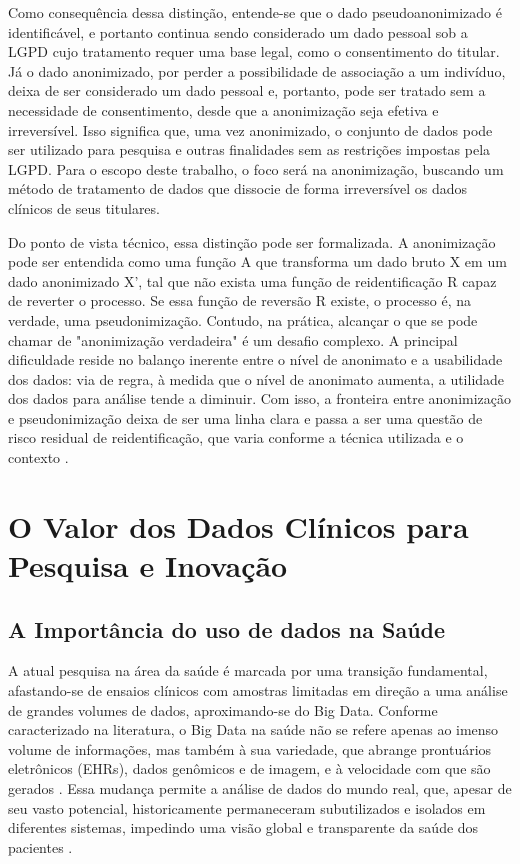 Como consequência dessa distinção, entende-se que o dado pseudoanonimizado é identificável, e portanto continua sendo considerado um dado pessoal sob a LGPD cujo tratamento requer uma base legal, como o consentimento do titular. Já o dado anonimizado, por perder a possibilidade de associação a um indivíduo, deixa de ser considerado um dado pessoal e, portanto, pode ser tratado sem a necessidade de consentimento, desde que a anonimização seja efetiva e irreversível. Isso significa que, uma vez anonimizado, o conjunto de dados pode ser utilizado para pesquisa e outras finalidades sem as restrições impostas pela LGPD. Para o escopo deste trabalho, o foco será na anonimização, buscando um método de tratamento de dados que dissocie de forma irreversível os dados clínicos de seus titulares.

Do ponto de vista técnico, essa distinção pode ser formalizada. A anonimização pode ser entendida como uma função A que transforma um dado bruto X em um dado anonimizado X’, tal que não exista uma função de reidentificação R capaz de reverter o processo. Se essa função de reversão R existe, o processo é, na verdade, uma pseudonimização. Contudo, na prática, alcançar o que se pode chamar de "anonimização verdadeira" é um desafio complexo. A principal dificuldade reside no balanço inerente entre o nível de anonimato e a usabilidade dos dados: via de regra, à medida que o nível de anonimato aumenta, a utilidade dos dados para análise tende a diminuir. Com isso, a fronteira entre anonimização e pseudonimização deixa de ser uma linha clara e passa a ser uma questão de risco residual de reidentificação, que varia conforme a técnica utilizada e o contexto \cite{Zuo2021Data}.

\section{O Valor dos Dados Clínicos para Pesquisa e Inovação}
\label{sec:fund-valor-dados}

\subsection{A Importância do uso de dados na Saúde}
\label{subsec:fund-importancia-dados}
A atual pesquisa na área da saúde é marcada por uma transição fundamental, afastando-se de ensaios clínicos com amostras limitadas em direção a uma análise de grandes volumes de dados, aproximando-se do Big Data. Conforme caracterizado na literatura, o Big Data na saúde não se refere apenas ao imenso volume de informações, mas também à sua variedade, que abrange prontuários eletrônicos (EHRs), dados genômicos e de imagem, e à velocidade com que são gerados \cite{Belle2015}. Essa mudança permite a análise de dados do mundo real, que, apesar de seu vasto potencial, historicamente permaneceram subutilizados e isolados em diferentes sistemas, impedindo uma visão global e transparente da saúde dos pacientes \cite{Belle2015}.

